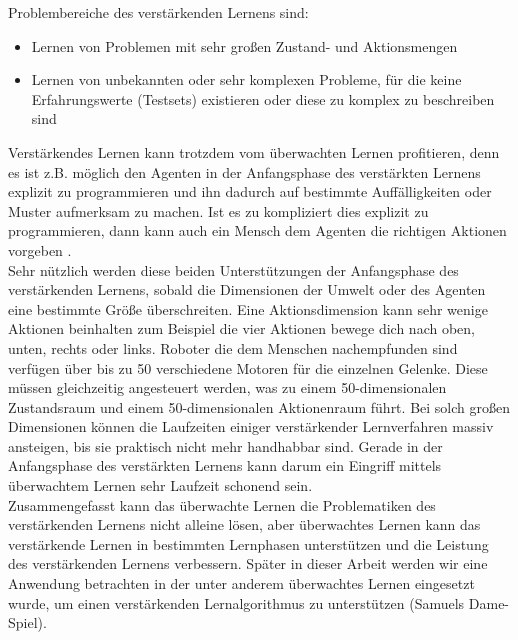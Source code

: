 Problembereiche des verstärkenden Lernens sind:
\begin{itemize}
\item Lernen von Problemen mit sehr großen Zustand- und Aktionsmengen
\item Lernen von unbekannten oder sehr komplexen Probleme, für die keine Erfahrungswerte (Testsets) existieren oder diese zu komplex zu beschreiben sind 
\end{itemize}

Verstärkendes Lernen kann trotzdem vom überwachten Lernen profitieren, denn es ist z.B. möglich den Agenten in der Anfangsphase des verstärkten Lernens explizit zu programmieren und ihn dadurch auf bestimmte Auffälligkeiten oder Muster aufmerksam zu machen. Ist es zu kompliziert dies explizit zu programmieren, dann kann auch ein Mensch dem Agenten die richtigen Aktionen vorgeben \cite[306]{Ertel}. \\

Sehr nützlich werden diese beiden Unterstützungen der Anfangsphase des verstärkenden Lernens, sobald die Dimensionen der Umwelt oder des Agenten eine bestimmte Größe überschreiten. Eine Aktionsdimension kann sehr wenige Aktionen beinhalten zum Beispiel die vier Aktionen bewege dich nach oben, unten, rechts oder links. Roboter die dem Menschen nachempfunden sind verfügen über bis zu 50 verschiedene Motoren für die einzelnen Gelenke. Diese müssen gleichzeitig angesteuert werden, was zu einem 50-dimensionalen Zustandsraum und einem 50-dimensionalen Aktionenraum führt\cite[\acs{vgl.} 305\psq]{Ertel}. Bei solch großen Dimensionen können die Laufzeiten einiger verstärkender Lernverfahren massiv ansteigen, bis sie praktisch nicht mehr handhabbar sind. Gerade in der Anfangsphase des verstärkten Lernens kann darum ein Eingriff mittels überwachtem Lernen sehr Laufzeit schonend sein. \\

Zusammengefasst kann das überwachte Lernen die Problematiken des verstärkenden Lernens nicht alleine lösen, aber überwachtes Lernen kann das verstärkende Lernen in bestimmten Lernphasen unterstützen und die Leistung des verstärkenden Lernens verbessern. Später in dieser Arbeit werden wir eine Anwendung betrachten in der unter anderem überwachtes Lernen eingesetzt wurde, um einen verstärkenden Lernalgorithmus zu unterstützen (Samuels Dame-Spiel).

